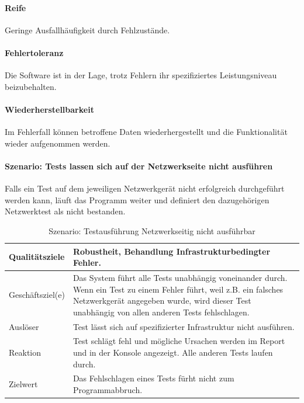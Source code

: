 \documentclass[]{subfiles}
\begin{document}
		\paragraph{Reife}
		Geringe Ausfallhäufigkeit durch Fehlzustände.

		\paragraph{Fehlertoleranz}
		Die Software ist in der Lage, trotz Fehlern ihr spezifiziertes Leistungsniveau beizubehalten.

		\paragraph{Wiederherstellbarkeit}
		Im Fehlerfall können betroffene Daten wiederhergestellt und die Funktionalität wieder aufgenommen werden.

		\paragraph{Szenario: Tests lassen sich auf der Netzwerkseite nicht ausführen}
		Falls ein Test auf dem jeweiligen Netzwerkgerät nicht erfolgreich durchgeführt werden kann, läuft das Programm weiter und definiert den dazugehörigen Netzwerktest als nicht bestanden.
		
		\begin{table}[!h]
			\begin{tabularx}{\textwidth}{lX}
				\toprule
				Qualitätsziele & Robustheit, Behandlung Infrastrukturbedingter Fehler.  \\
				\midrule
				Geschäftsziel(e) & Das System führt alle Tests unabhängig voneinander durch. Wenn ein Test zu einem Fehler führt, weil z.B. ein falsches Netzwerkgerät angegeben wurde, wird dieser Test unabhängig von allen anderen Tests fehlschlagen.  \\
				\midrule
				Auslöser & Test lässt sich auf spezifizierter Infrastruktur nicht ausführen.  \\
				\midrule
				Reaktion & Test schlägt fehl und mögliche Ursachen werden im Report und in der Konsole angezeigt. Alle anderen Tests laufen durch.  \\
				\midrule
				Zielwert & Das Fehlschlagen eines Tests fürht nicht zum Programmabbruch.  \\
				\bottomrule
			\end{tabularx}
			\caption{Szenario: Testausführung Netzwerkseitig nicht ausführbar}
		\end{table}
		
\end{document}
